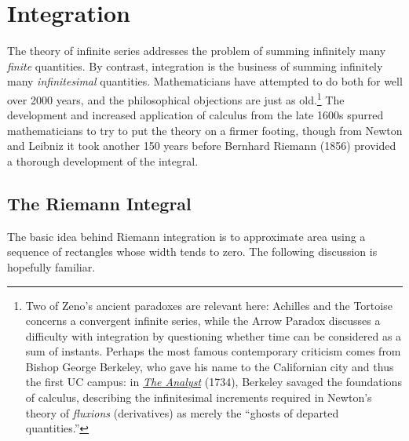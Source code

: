 \graphicspath{{4int/asy/}}

\section{Integration}

The theory of infinite series addresses the problem of summing infinitely many \emph{finite} quantities. By contrast, integration is the business of summing infinitely many \emph{infinitesimal} quantities. Mathematicians have attempted to do both for well over 2000 years, and the philosophical objections are just as old.\footnote{Two of Zeno's ancient paradoxes are relevant here: Achilles and the Tortoise concerns a convergent infinite series, while the Arrow Paradox discusses a difficulty with integration by questioning whether time can be considered as a sum of instants. Perhaps the most famous contemporary criticism comes from Bishop George Berkeley, who gave his name to the Californian city and thus the first UC campus: in \href{https://en.wikipedia.org/wiki/The_Analyst}{\emph{The Analyst}} (1734), Berkeley savaged the foundations of calculus, describing the infinitesimal increments required in Newton's theory of \emph{fluxions} (derivatives) as merely the ``ghosts of departed quantities.''} The development and increased application of calculus from the late 1600s spurred mathematicians to try to put the theory on a firmer footing, though from Newton and Leibniz it took another 150 years before Bernhard Riemann (1856) provided a thorough development of the integral.



\setcounter{subsection}{31}
\subsection{The Riemann Integral}\label{sec:riemann}

The basic idea behind Riemann integration is to approximate area using a sequence of rectangles whose width tends to zero. The following discussion is hopefully familiar.

